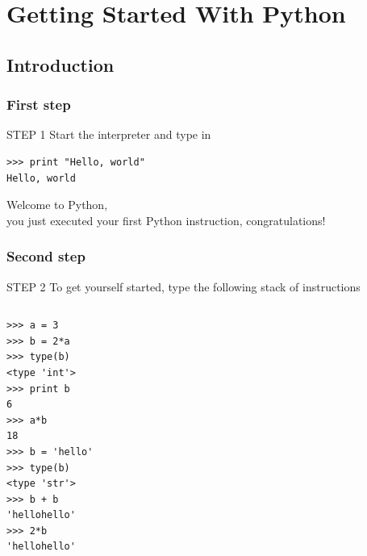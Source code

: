 \documentclass[colorlinks]{beamer}
\begin{document}


\section{Getting Started With Python}

\subsection{Introduction}
\begin{frame}[fragile]\frametitle{First step}
\begin{block}{\centering STEP 1}
\centering Start the interpreter and type in
\end{block}
\begin{verbatim}
>>> print "Hello, world"
Hello, world
\end{verbatim}

\begin{block}{}
\centering Welcome to Python,\\ you just executed your first Python instruction, congratulations!
\end{block}
\end{frame}

\begin{frame}[fragile]\frametitle{Second step}
\vspace{-0.1cm}
\begin{block}{\centering STEP 2}
\centering To get yourself started, type the following stack of instructions
\end{block}
 \begin{columns}[T]
\begin{column}{.5\textwidth}
\tiny
\begin{verbatim}
>>> a = 3
>>> b = 2*a
>>> type(b)
<type 'int'>
>>> print b
6
>>> a*b
18
>>> b = 'hello'
>>> type(b)
<type 'str'>
>>> b + b
'hellohello'
>>> 2*b
'hellohello'
\end{verbatim}


\end{column}
    \begin{column}{.5\textwidth}
\end{column}
\end{columns}
\end{frame}
\end{document}
